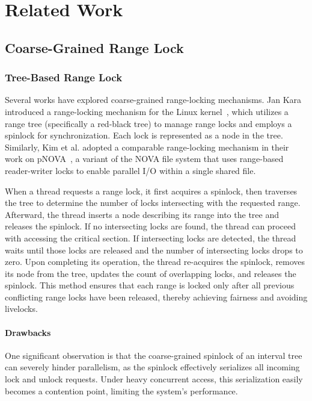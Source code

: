 \chapter{Related Work}\label{chapter:relatedwork}

\section{Coarse-Grained Range Lock}

\subsection{Tree-Based Range Lock}

Several works have explored coarse-grained range-locking mechanisms. Jan Kara introduced a range-locking mechanism for the Linux kernel~\parencite{linuxRangeLockImpl2013}, which utilizes a range tree (specifically a red-black tree) to manage range locks and employs a spinlock for synchronization. Each lock is represented as a node in the tree. Similarly, Kim et al. adopted a comparable range-locking mechanism in their work on pNOVA~\parencite{kim2019pnova}, a variant of the NOVA file system that uses range-based reader-writer locks to enable parallel I/O within a single shared file.

When a thread requests a range lock, it first acquires a spinlock, then traverses the tree to determine the number of locks intersecting with the requested range. Afterward, the thread inserts a node describing its range into the tree and releases the spinlock. If no intersecting locks are found, the thread can proceed with accessing the critical section. If intersecting locks are detected, the thread waits until those locks are released and the number of intersecting locks drops to zero. Upon completing its operation, the thread re-acquires the spinlock, removes its node from the tree, updates the count of overlapping locks, and releases the spinlock. This method ensures that each range is locked only after all previous conflicting range locks have been released, thereby achieving fairness and avoiding livelocks.

\subsubsection*{Drawbacks}

One significant observation is that the coarse-grained spinlock of an interval tree can severely hinder parallelism, as the spinlock effectively serializes all incoming lock and unlock requests. Under heavy concurrent access, this serialization easily becomes a contention point, limiting the system's performance.

